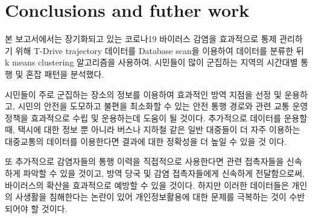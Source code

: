 \documentclass[10pt,journal,compsoc]{IEEEtran}
\begin{document}
\section{Conclusions and futher work}
본 보고서에서는 장기화되고 있는 코로나19 바이러스 감염을 효과적으로 통제 관리하기 위해 T-Drive trajectory 데이터를 Database scan을 이용하여 데이터를 분류한 뒤 k means clustering 알고리즘을 사용하여, 시민들이 많이 군집하는 지역의 시간대별 통행 및 혼잡 패턴을 분석했다.

시민들이 주로 군집하는 장소의 정보를 이용하여 효과적인 방역 지점을 선정 및 운용하고, 시민의 안전을 도모하고 불편을 최소화할 수 있는 안전 통행 경로와 관련 교통 운영정책을 효과적으로 수립 및 운용하는데 도움이 될 것이다. 추가적으로 데이터를 운용할 때, 택시에 대한 정보 뿐 아니라 버스나 지하철 같은 일반 대중들이 더 자주 이용하는 대중교통의 데이터를 이용한다면 결과에 대한 정확성을 더 높일 수 있을 것 이다.

또 추가적으로 감염자들의 통행 이력을 직접적으로 사용한다면 관련 접촉자들을 신속하게 파악할 수 있을 것이고, 방역 당국 및 감염 접촉자들에게 신속하게 전달함으로써, 바이러스의 확산을 효과적으로 예방할 수 있을 것이다. 하지만 이러한 데이터들은 개인의 사생활을 침해한다는 논란이 있어 개인정보활용에 대한 문제를 극복하는 것이 수반되어야 할 것이다.

\ifCLASSOPTIONcaptionsoff
  \newpage
\fi
\end{document}
